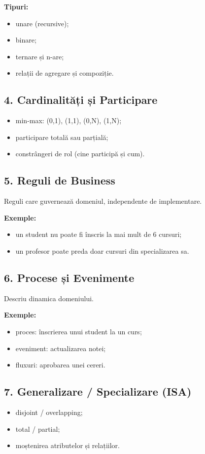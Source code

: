 \documentclass[12pt,a4paper]{article}
\begin{document}
\textbf{Tipuri:}
\begin{itemize}[noitemsep]
    \item unare (recursive);
    \item binare;
    \item ternare și n-are;
    \item relații de agregare și compoziție.
\end{itemize}

\subsection*{4. Cardinalități și Participare}
\begin{itemize}[noitemsep]
    \item min-max: (0,1), (1,1), (0,N), (1,N);
    \item participare totală sau parțială;
    \item constrângeri de rol (cine participă și cum).
\end{itemize}

\subsection*{5. Reguli de Business}
Reguli care guvernează domeniul, independente de implementare.

\textbf{Exemple:}
\begin{itemize}[noitemsep]
    \item un student nu poate fi înscris la mai mult de 6 cursuri;
    \item un profesor poate preda doar cursuri din specializarea sa.
\end{itemize}

\subsection*{6. Procese și Evenimente}
Descriu dinamica domeniului.

\textbf{Exemple:}
\begin{itemize}[noitemsep]
    \item proces: înscrierea unui student la un curs;
    \item eveniment: actualizarea notei;
    \item fluxuri: aprobarea unei cereri.
\end{itemize}

\subsection*{7. Generalizare / Specializare (ISA)}
\begin{itemize}[noitemsep]
    \item disjoint / overlapping;
    \item total / partial;
    \item moștenirea atributelor și relațiilor.
\end{itemize}
\end{document}
